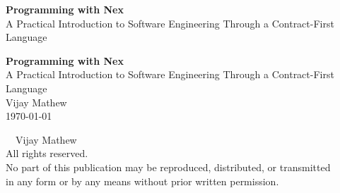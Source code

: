 \frontmatter
\pagestyle{frontstyle}

\thispagestyle{empty}
\vspace*{\fill}
\begin{center}
{\Huge\bfseries Programming with Nex}\\[0.7em]
{\Large A Practical Introduction to Software Engineering Through a Contract-First Language}
\end{center}
\vspace*{\fill}
\clearpage

\thispagestyle{empty}
\vspace*{0.20\textheight}
\begin{center}
{\Huge\bfseries Programming with Nex}\\[0.9em]
{\LARGE A Practical Introduction to Software Engineering Through a Contract-First Language}\\[3.0em]
{\large Vijay Mathew}\\[0.5em]
{\large \today}
\end{center}
\clearpage

\thispagestyle{empty}
\vspace*{\fill}
\noindent\textcopyright\ \the\year\ Vijay Mathew\\
All rights reserved.\\
No part of this publication may be reproduced, distributed, or transmitted\\
in any form or by any means without prior written permission.
\vspace*{\fill}
\clearpage

\tableofcontents
\clearpage

\mainmatter
\pagestyle{mainstyle}
